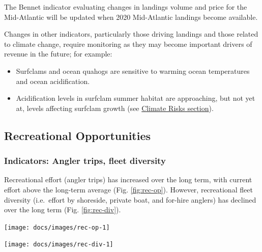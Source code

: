 \documentclass[
  10pt,
]{article}
\providecommand{\tightlist}{%
  \setlength{\itemsep}{0pt}\setlength{\parskip}{0pt}}
\let\origfigure\figure
\let\endorigfigure\endfigure
\renewenvironment{figure}[1][2] {
    \expandafter\origfigure\expandafter[H]
} {
    \endorigfigure
}
\begin{document}
The Bennet indicator evaluating changes in landings volume and price for
the Mid-Atlantic will be updated when 2020 Mid-Atlantic landings become
available.

Changes in other indicators, particularly those driving landings and
those related to climate change, require monitoring as they may become
important drivers of revenue in the future; for example:

\begin{itemize}
\tightlist
\item
  Surfclams and ocean quahogs are sensitive to warming ocean
  temperatures and ocean acidification.\\
\item
  Acidification levels in surfclam summer habitat are approaching, but
  not yet at, levels affecting surfclam growth (see
  \protect\hyperlink{climate-and-ecosystem-productivity}{Climate Risks
  section}).
\end{itemize}

\hypertarget{recreational-opportunities}{%
\subsection{Recreational
Opportunities}\label{recreational-opportunities}}

\hypertarget{indicators-angler-trips-fleet-diversity}{%
\subsubsection{Indicators: Angler trips, fleet
diversity}\label{indicators-angler-trips-fleet-diversity}}

Recreational effort (angler trips) has increased over the long term,
with current effort above the long-term average (Fig. \ref{fig:rec-op}).
However, recreational fleet diversity (i.e.~effort by shoreside, private
boat, and for-hire anglers) has declined over the long term (Fig.
\ref{fig:rec-div}).

\begin{figure}

{\centering \texttt{[image: docs/images/rec-op-1]} 

}

\caption{Recreational effort in the Mid-Atlantic.}\label{fig:rec-op}
\end{figure}

\begin{figure}

{\centering \texttt{[image: docs/images/rec-div-1]} 

}

\caption{Recreational fleet effort diversity in the Mid-Atlantic.}\label{fig:rec-div}
\end{figure}
\end{document}
